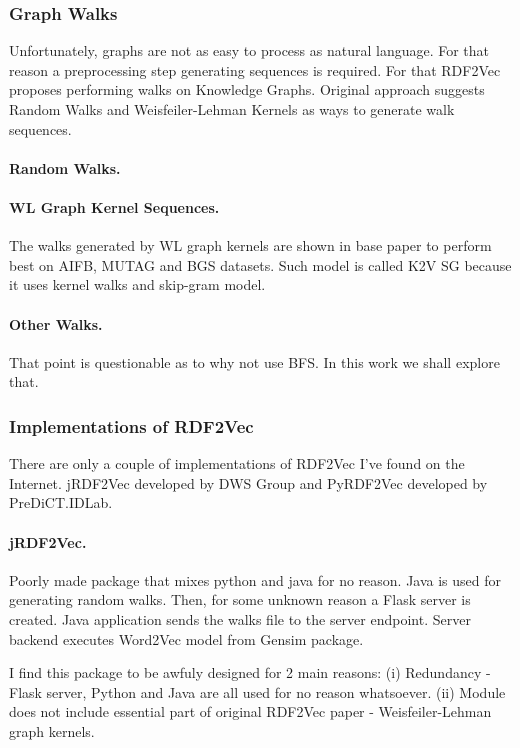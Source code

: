 \documentclass[a4paper,oneside,bibliography=totoc]{scrartcl}
\begin{document}
\subsubsection{Graph Walks}
Unfortunately, graphs are not as easy to process as natural language. For that reason a preprocessing step generating sequences is required. 
For that RDF2Vec proposes performing walks on Knowledge Graphs. Original approach suggests Random Walks and Weisfeiler-Lehman Kernels as ways to generate walk sequences. 

\paragraph{Random Walks.}

\paragraph{WL Graph Kernel Sequences.} The walks generated by WL graph kernels are shown in base paper to perform best on AIFB, MUTAG and BGS datasets. 
Such model is called K2V SG because it uses kernel walks and skip-gram model. 

\paragraph{Other Walks.} That point is questionable as to why not use BFS. In this work we shall explore that. 


\subsubsection{Implementations of RDF2Vec}

There are only a couple of implementations of RDF2Vec I've found on the Internet. jRDF2Vec developed by DWS Group and PyRDF2Vec developed by PreDiCT.IDLab. 

\paragraph{jRDF2Vec.} Poorly made package that mixes python and java for no reason. 
Java is used for generating random walks. Then, for some unknown reason a Flask server is created. 
Java application sends the walks file to the server endpoint. 
Server backend executes Word2Vec model from Gensim package.

I find this package to be awfuly designed for 2 main reasons: (i) Redundancy - Flask server, Python and Java are all used for no reason whatsoever. 
(ii) Module does not include essential part of original RDF2Vec paper - Weisfeiler-Lehman graph kernels. 
\end{document}

